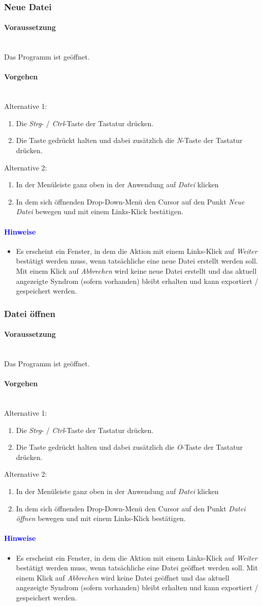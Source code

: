 \documentclass[enabledeprecatedfontcommands,fontsize=11pt,paper=a4,twoside]{scrartcl}
\newcommand*{\hint}{\paragraph{\textcolor{blue}{Hinweise}}}
\newcommand*{\condition}{\paragraph{Voraussetzung}$\;$ \vspace{0.2cm}\\}
\newcommand*{\actions}{\paragraph{Vorgehen} $\;$\vspace{0.2cm}\\}
\begin{document}
		\subsubsection{Neue Datei}
		\condition 	
		Das Programm ist geöffnet.
		\actions
		Alternative 1:
		\begin{enumerate}
				\item Die \textit{Strg}- / \textit{Ctrl}-Taste der Tastatur drücken.
				\item Die Taste gedrückt halten und dabei zusätzlich die \textit{N}-Taste der Tastatur drücken.
		\end{enumerate}				
		Alternative 2:
		\begin{enumerate}
				\item In der Menüleiste ganz oben in der Anwendung auf \textit{Datei} klicken 
				\item In dem sich öffnenden Drop-Down-Menü den Cursor auf den Punkt \textit{Neue Datei} bewegen und mit einem Links-Klick bestätigen.
		\end{enumerate}		
		\hint
		\begin{itemize}
				\item Es erscheint ein Fenster, in dem die Aktion mit einem Links-Klick auf \textit{Weiter} bestätigt werden muss, wenn tatsächliche eine neue Datei erstellt werden soll. Mit einem Klick auf \textit{Abbrechen} wird keine neue Datei erstellt und das aktuell angezeigte Syndrom (sofern vorhanden) bleibt erhalten und kann exportiert / gespeichert werden.
		\end{itemize}
		
							\newpage
		\subsubsection{Datei öffnen}
		\condition 	
		Das Programm ist geöffnet.
		\actions
		Alternative 1:
		\begin{enumerate}
				\item Die \textit{Strg}- / \textit{Ctrl}-Taste der Tastatur drücken.
				\item Die Taste gedrückt halten und dabei zusätzlich die \textit{O}-Taste der Tastatur drücken.
		\end{enumerate}				
		Alternative 2:
		\begin{enumerate}
				\item In der Menüleiste ganz oben in der Anwendung auf \textit{Datei} klicken 
				\item In dem sich öffnenden Drop-Down-Menü den Cursor auf den Punkt \textit{Datei öffnen} bewegen und mit einem Links-Klick bestätigen.
		\end{enumerate}		
		\hint
		\begin{itemize}
				\item Es erscheint ein Fenster, in dem die Aktion mit einem Links-Klick auf \textit{Weiter} bestätigt werden muss, wenn tatsächliche eine Datei geöffnet werden soll. Mit einem Klick auf \textit{Abbrechen} wird keine Datei geöffnet und das aktuell angezeigte Syndrom (sofern vorhanden) bleibt erhalten und kann exportiert / gespeichert werden.
		\end{itemize}
				
\end{document}

